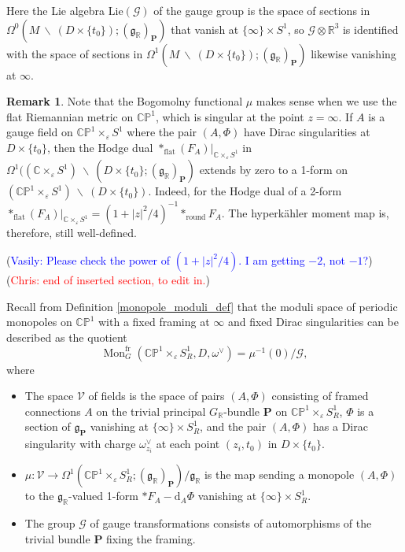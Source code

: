 \documentclass[11pt, oneside, reqno]{amsart}
\theoremstyle{definition} \newtheorem{definition}{Definition}[section]
\theoremstyle{definition} \newtheorem{remark}[definition]{Remark}
\theoremstyle{definition} \newtheorem{remarks}[definition]{Remarks}
\theoremstyle{definition} \newtheorem{question}[definition]{Question}
\theoremstyle{definition} \newtheorem*{note}{Note}
\theoremstyle{definition} \newtheorem{example}[definition]{Example}
\theoremstyle{definition} \newtheorem{examples}[definition]{Examples}
\renewcommand{\gg}{\mathfrak{g}}
\newcommand{\bb}[1]{\mathbb{#1}}
\newcommand{\mr}[1]{\mathrm{#1}}
\newcommand{\mc}[1]{\mathcal{#1}}
\newcommand{\bo}[1]{\boldsymbol{#1}}
\newcommand{\bs}{\ \backslash \ }
\newcommand{\CC}{\mathbb{C}}
\newcommand{\RR}{\mathbb{R}}
\newcommand{\eps}{\varepsilon}
\DeclareMathOperator{\mon}{Mon}
\renewcommand{\d}{\mathrm{d}}
\newcommand{\fr}{\mathrm{fr}}
\newcommand{\chris}[1]{(\textcolor{red}{Chris: #1})}
\newcommand{\vasily}[1]{(\textcolor{blue}{Vasily: #1})}
\begin{document}
Here the Lie algebra $\mr{Lie}(\mc G)$ of the gauge group is the space of sections in $\Omega^0(M \bs (D \times \{t_0\}); (\gg_\RR)_{\bo P})$ that vanish at $\{\infty\} \times S^1$, so $\mc G \otimes \RR^3$ is identified with the space of sections in $\Omega^1(M \bs (D \times \{t_0\}); (\gg_\RR)_{\bo P})$ likewise vanishing at $\infty$.

\begin{remark} \label{flat_metric_remark}
Note that the Bogomolny functional $\mu$ makes sense when we use the flat Riemannian metric on $\bb{CP}^1$, which is singular at the point $z = \infty$.  If $A$ is a gauge field on $\bb{CP}^1 \times_\eps S^1$ where the pair $(A,\Phi)$ have Dirac singularities at $D \times \{t_0\}$, then the Hodge dual $\ast_{\mr{flat}} (F_A)|_{\CC \times_\eps S^1}$ in $\Omega^1((\CC \times_\eps S^1) \bs (D \times \{t_0\}; (\gg_\RR)_{\bo P})$ extends by zero to a 1-form on $(\bb{CP}^1 \times_\eps S^1) \bs (D \times \{t_0\})$.  Indeed, for the Hodge dual of a 2-form $\ast_{\mr{flat}} (F_A)|_{\CC \times_\eps S^1} = (1+|z|^2/4)^{-1} \ast_{\mr{round}} F_A$.  The hyperk\"ahler moment map is, therefore, still well-defined.
\end{remark}
\vasily{Please check the power of $(1+|z|^2/4)$. I am getting $-2$, not $-1$?}
\chris{end of inserted section, to edit in.}

Recall from Definition \ref{monopole_moduli_def} that the moduli space of periodic monopoles on $\bb{CP}^1$ with a fixed framing at $\infty$ and fixed Dirac singularities can be described as the quotient 
\[\mon_G^{\fr}(\bb{CP}^1 \times_\eps S^1_R, D, \omega^\vee) = \mu^{-1}(0)/\mc G,\]
where 
\begin{itemize}
\item The space $\mc V$ of fields is the space of pairs $(A,\Phi)$ consisting of framed connections $A$ on the trivial principal $G_\RR$-bundle $\bo P$ on $\bb{CP}^1 \times_\eps S^1_R$, $\Phi$ is a section of $\gg_{\bo P}$ vanishing at $\{\infty\} \times S^1_R$, and the pair $(A,\Phi)$ has a Dirac singularity with charge $\omega^\vee_{z_i}$ at each point $(z_i,t_0)$ in $D \times \{t_0\}$.
\item $\mu \colon \mc V \to \Omega^1(\bb{CP}^1 \times_\eps S^1_R; (\gg_\RR)_{\bo P})/\gg_\RR$ is the map sending a monopole $(A, \Phi)$ to the $\gg_\RR$-valued 1-form $\ast F_A - \d_A \Phi$ vanishing at $\{\infty\} \times S^1_R$.  
\item The group $\mc G$ of gauge transformations consists of automorphisms of the trivial bundle $\bo P$ fixing the framing.
\end{itemize}
\end{document}
